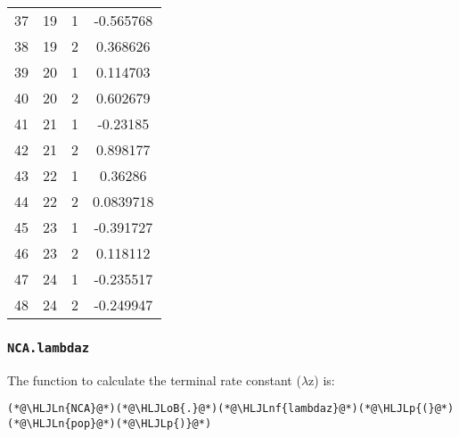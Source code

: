 \documentclass[12pt,a4paper]{article}
\newcommand{\HLJLn}[1]{#1}
\newcommand{\HLJLnf}[1]{\textcolor[RGB]{66,102,213}{#1}}
\newcommand{\HLJLoB}[1]{\textcolor[RGB]{102,102,102}{\textbf{#1}}}
\newcommand{\HLJLp}[1]{#1}
\begin{document}
\begin{tabular}{r|ccc}
	37 & 19 & 1 & -0.565768 \\
	38 & 19 & 2 & 0.368626 \\
	39 & 20 & 1 & 0.114703 \\
	40 & 20 & 2 & 0.602679 \\
	41 & 21 & 1 & -0.23185 \\
	42 & 21 & 2 & 0.898177 \\
	43 & 22 & 1 & 0.36286 \\
	44 & 22 & 2 & 0.0839718 \\
	45 & 23 & 1 & -0.391727 \\
	46 & 23 & 2 & 0.118112 \\
	47 & 24 & 1 & -0.235517 \\
	48 & 24 & 2 & -0.249947 \\
\end{tabular}


\subsubsection{\texttt{NCA.lambdaz}}
The function to calculate the terminal rate constant (\ensuremath{\lambda}z) is:


\begin{lstlisting}
(*@\HLJLn{NCA}@*)(*@\HLJLoB{.}@*)(*@\HLJLnf{lambdaz}@*)(*@\HLJLp{(}@*)(*@\HLJLn{pop}@*)(*@\HLJLp{)}@*)
\end{lstlisting}
\end{document}
